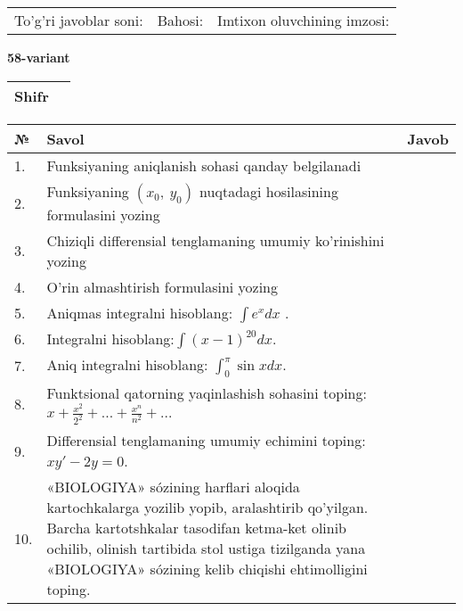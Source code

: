 \documentclass{article}
\begin{document}
  \vspace{1cm}
  
  \begin{tabular}{lll}
  To'g'ri javoblar soni: \underline{\hspace{1.5cm}} & 
  Bahosi: \underline{\hspace{1.5cm}} & 
  Imtixon oluvchining imzosi: \underline{\hspace{2cm}} \\
  \end{tabular}
  
  \egroup
  
  \newpage
  
  
  \textbf{58-variant}\\
  
  \bgroup
  \def\arraystretch{1.6} %
  
  \begin{tabular}{|m{5.7cm}|m{9.5cm}|}
  \hline
  Shifr & \\
  \hline
  \end{tabular}
  
  \vspace{1cm}
  
  \begin{tabular}{|m{0.7cm}|m{10cm}|m{4cm}|}
  \hline
  № & Savol & Javob \\
  \hline
  1. & Funksiyaning aniqlanish sohasi qanday belgilanadi &  \\
  \hline
  2. & Funksiyaning \((x_{0},\ y_{0})\) nuqtadagi hosilasining formulasini yozing &  \\
  \hline
  3. & Chiziqli differensial tenglamaning umumiy ko'rinishini yozing &  \\
  \hline
  4. & O'rin almashtirish formulasini yozing &  \\
  \hline
  5. & Aniqmas integralni hisoblang: \(\int {e^{x}dx}\) . &  \\
  \hline
  6. & Integralni hisoblang:\(\int {(x - 1)^{20}}dx\). &  \\
  \hline
  7. & Aniq integralni hisoblang: \(\int_{0}^{\pi}{\sin xdx}\). &  \\
  \hline
  8. & Funktsional qatorning yaqinlashish sohasini toping: \(x + \frac{x^{2}}{2^{2}} + ... + \frac{x^{n}}{n^{2}} + ...\) &  \\
  \hline
  9. & Differensial tenglamaning umumiy echimini toping: \(xy' - 2y = 0\). &  \\
  \hline
  10. & «BIOLOGIYA» sózining harflari aloqida kartochkalarga yozilib yopib, aralashtirib qo'yilgan. Barcha kartotshkalar tasodifan ketma-ket olinib ochilib, olinish tartibida stol ustiga tizilganda yana «BIOLOGIYA» sózining kelib chiqishi ehtimolligini toping. &  \\
  \hline
  \end{tabular}
  
\end{document}
